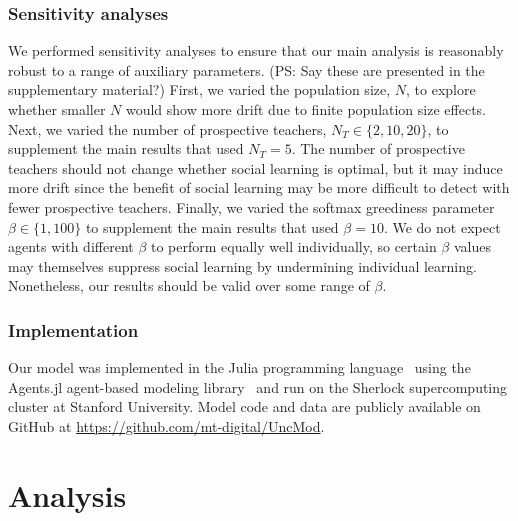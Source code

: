 \documentclass[letterpaper,11.5pt]{scrartcl}
\newcommand{\ps}[1]{{\textcolor{mygreen} {({\tiny PS:} #1)}}}
\begin{document}
\subsubsection{Sensitivity analyses}

We performed sensitivity analyses to ensure that our main analysis is reasonably
robust to a range of auxiliary parameters. \ps{Say these are presented in the supplementary material?} First, we varied the population size, $N$, to explore whether smaller $N$ would show more drift due to finite population size effects. %
Next, we varied the number of prospective teachers, $N_T \in \{2, 10, 20\}$, to supplement the main results that used $N_T = 5$. The number of prospective
teachers should not change whether social learning is optimal, but it may induce more drift since the benefit of social learning may
be more difficult to detect with fewer prospective teachers. Finally, we varied the
softmax greediness parameter $\beta \in \{1, 100\}$ to supplement the main results
that used $\beta = 10$. We do not
expect agents with different $\beta$ to perform equally well 
individually, so certain $\beta$ values may themselves suppress social learning
by undermining individual learning. Nonetheless, our results
should be valid over some range of $\beta$. 


\subsubsection{Implementation}

Our model was implemented in the Julia programming language~\cite{Bezanson2017} 
using the Agents.jl agent-based modeling library~\cite{Datseris2022} and run
on the Sherlock supercomputing cluster at Stanford University. Model code and
data are publicly available on GitHub at \url{https://github.com/mt-digital/UncMod}.


\section{Analysis}
\end{document}
